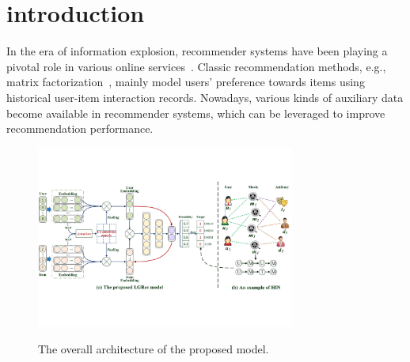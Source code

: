 \section{introduction}
In the era of information explosion, recommender systems have been playing a pivotal role in various online services~\cite{sarwar2001item}. Classic recommendation methods, e.g., matrix factorization~\cite{rendle2009bpr}, mainly model users' preference towards items using historical user-item interaction records. Nowadays, various kinds of auxiliary data become available in recommender systems, which can be leveraged to improve recommendation performance.
\begin{figure}
  \centering
  \includegraphics[width=8.5cm]{image/model.pdf}\\
  \caption{The overall architecture of the proposed model.}\label{fig-model}
\end{figure}

